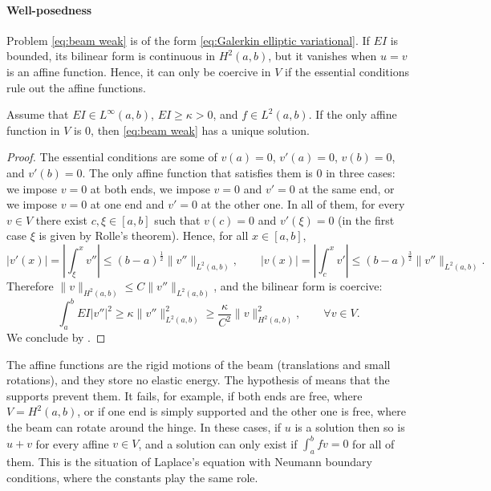 \paragraph{Well-posedness}
Problem \eqref{eq:beam weak} is of the form \eqref{eq:Galerkin elliptic variational}.
If $EI$ is bounded, its bilinear form is continuous in $H^2(a,b)$, but it vanishes when $u = v$ is an affine function.
Hence, it can only be coercive in $V$ if the essential conditions rule out the affine functions.
\begin{lemma}
    \label{lem:beam well-posed}
    Assume that $EI \in L^\infty(a,b)$, $EI \ge \kappa > 0$, and $f \in L^2(a,b)$.
    If the only affine function in $V$ is $0$, then \eqref{eq:beam weak} has a unique solution.
\end{lemma}
\begin{proof}
    The essential conditions are some of $v(a) = 0$, $v'(a) = 0$, $v(b) = 0$, and $v'(b) = 0$.
    The only affine function that satisfies them is $0$ in three cases: we impose $v = 0$ at both ends, we impose $v = 0$ and $v' = 0$ at the same end, or we impose $v = 0$ at one end and $v' = 0$ at the other one.
    In all of them, for every $v \in V$ there exist $c, \xi \in [a,b]$ such that $v(c) = 0$ and $v'(\xi) = 0$ (in the first case $\xi$ is given by Rolle's theorem).
    Hence, for all $x \in [a,b]$,
    \begin{equation*}
        |v'(x)| = \left| \int_\xi^x v'' \right| \le (b-a)^{\frac 1 2} \| v'' \|_{L^2(a,b)},
        \qquad
        |v(x)| = \left| \int_c^x v' \right| \le (b-a)^{\frac 3 2} \| v'' \|_{L^2(a,b)}.
    \end{equation*}
    Therefore $\| v \|_{H^2(a,b)} \le C \| v'' \|_{L^2(a,b)}$, and the bilinear form is coercive:
    \begin{equation*}
        \int_a^b EI |v''|^2 \ge \kappa \| v'' \|_{L^2(a,b)}^2 \ge \frac{\kappa}{C^2} \| v \|_{H^2(a,b)}^2, \qquad \forall v \in V.
    \end{equation*}
    We conclude by .
\end{proof}
\begin{remark}
    The affine functions are the rigid motions of the beam (translations and small rotations), and they store no elastic energy.
    The hypothesis of  means that the supports prevent them.
    It fails, for example, if both ends are free, where $V = H^2(a,b)$, or if one end is simply supported and the other one is free, where the beam can rotate around the hinge.
    In these cases, if $u$ is a solution then so is $u + v$ for every affine $v \in V$, and a solution can only exist if $\int_a^b f v = 0$ for all of them.
    This is the situation of Laplace's equation with Neumann boundary conditions, where the constants play the same role.
\end{remark}

